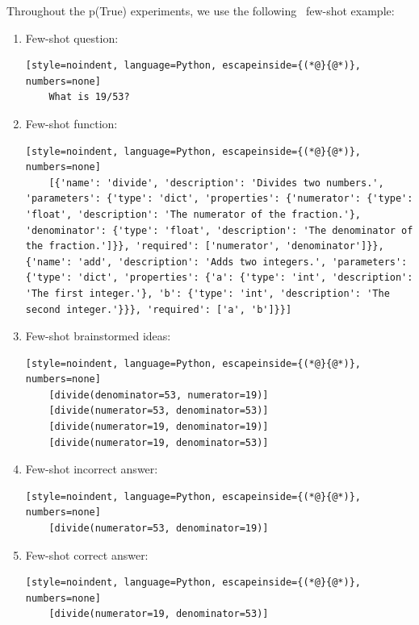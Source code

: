 \noindent 
Throughout the p(True)  experiments, we use the following\textcolor{white}{0} few-shot example: 
\begin{enumerate}
    \item Few-shot question:
    \begin{lstlisting}[style=noindent, language=Python, escapeinside={(*@}{@*)}, numbers=none]
    What is 19/53?
    \end{lstlisting}
    \item Few-shot function:
    \begin{lstlisting}[style=noindent, language=Python, escapeinside={(*@}{@*)}, numbers=none]
    [{'name': 'divide', 'description': 'Divides two numbers.', 'parameters': {'type': 'dict', 'properties': {'numerator': {'type': 'float', 'description': 'The numerator of the fraction.'}, 'denominator': {'type': 'float', 'description': 'The denominator of the fraction.']}}, 'required': ['numerator', 'denominator']}}, {'name': 'add', 'description': 'Adds two integers.', 'parameters': {'type': 'dict', 'properties': {'a': {'type': 'int', 'description': 'The first integer.'}, 'b': {'type': 'int', 'description': 'The second integer.'}}}, 'required': ['a', 'b']}}]
    \end{lstlisting}
    \item Few-shot brainstormed ideas:
    \begin{lstlisting}[style=noindent, language=Python, escapeinside={(*@}{@*)}, numbers=none]
    [divide(denominator=53, numerator=19)]
    [divide(numerator=53, denominator=53)]
    [divide(numerator=19, denominator=19)]
    [divide(numerator=19, denominator=53)]
    \end{lstlisting}
     \item Few-shot incorrect answer:
    \begin{lstlisting}[style=noindent, language=Python, escapeinside={(*@}{@*)}, numbers=none]
    [divide(numerator=53, denominator=19)]
    \end{lstlisting}
    \item Few-shot correct answer:
    \begin{lstlisting}[style=noindent, language=Python, escapeinside={(*@}{@*)}, numbers=none]
    [divide(numerator=19, denominator=53)]
    \end{lstlisting}
\end{enumerate}





